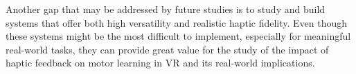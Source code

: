 Another gap that may be addressed by future studies is to study and build systems that offer both high versatility and realistic haptic fidelity. Even though these systems might be the most difficult to implement, especially for meaningful real-world tasks, they can provide great value for the study of the impact of haptic feedback on motor learning in VR and its real-world implications. 

